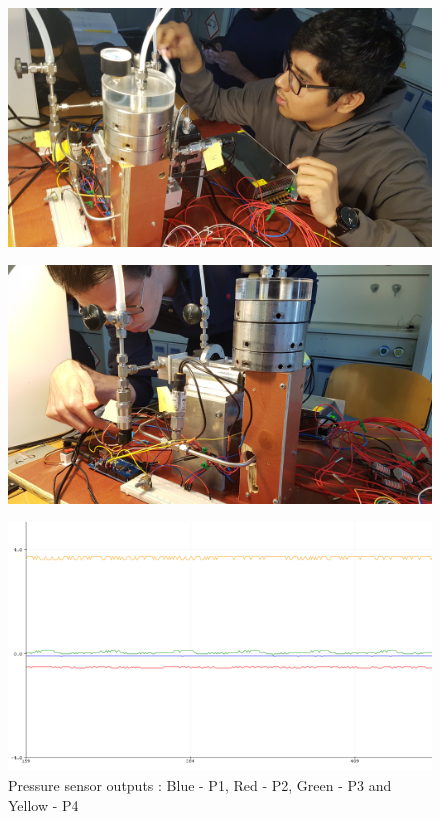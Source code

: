 \begin{figure}[H]
\centering
\begin{minipage}{.5\textwidth}
  \centering
  \includegraphics[width=0.9\linewidth]{images/mywork/Sprint2/Leaktest.jpg}
  \label{fig:leaktest}
\end{minipage}%
\begin{minipage}{.5\textwidth}
  \centering
  \includegraphics[width=0.9\linewidth]{images/mywork/Sprint2/desorbcheck.jpg}
  \label{fig:desorber}
\end{minipage}
\end{figure}

\begin{figure}[H]
    \centering
    \includegraphics{images/mywork/Sprint2/pressuresensor.png}
    \caption{Pressure sensor outputs : Blue - P1, Red - P2, Green - P3 and Yellow - P4}
    \label{fig:psensor}
\end{figure}


